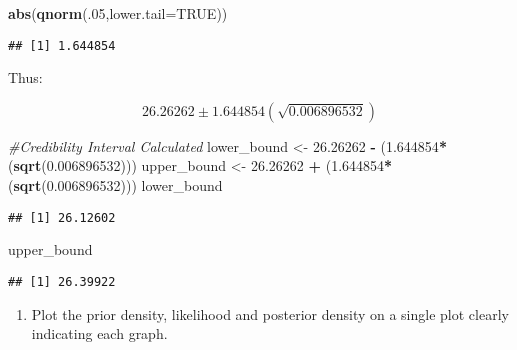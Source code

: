 \documentclass[]{article}
\newenvironment{Shaded}{\begin{snugshade}}{\end{snugshade}}
\newcommand{\KeywordTok}[1]{\textcolor[rgb]{0.13,0.29,0.53}{\textbf{#1}}}
\newcommand{\DataTypeTok}[1]{\textcolor[rgb]{0.13,0.29,0.53}{#1}}
\newcommand{\DecValTok}[1]{\textcolor[rgb]{0.00,0.00,0.81}{#1}}
\newcommand{\FloatTok}[1]{\textcolor[rgb]{0.00,0.00,0.81}{#1}}
\newcommand{\StringTok}[1]{\textcolor[rgb]{0.31,0.60,0.02}{#1}}
\newcommand{\CommentTok}[1]{\textcolor[rgb]{0.56,0.35,0.01}{\textit{#1}}}
\newcommand{\OtherTok}[1]{\textcolor[rgb]{0.56,0.35,0.01}{#1}}
\newcommand{\OperatorTok}[1]{\textcolor[rgb]{0.81,0.36,0.00}{\textbf{#1}}}
\newcommand{\NormalTok}[1]{#1}
\providecommand{\tightlist}{%
  \setlength{\itemsep}{0pt}\setlength{\parskip}{0pt}}
\begin{document}
\begin{Shaded}
\begin{Highlighting}[]
\KeywordTok{abs}\NormalTok{(}\KeywordTok{qnorm}\NormalTok{(.}\DecValTok{05}\NormalTok{,}\DataTypeTok{lower.tail=}\OtherTok{TRUE}\NormalTok{))}
\end{Highlighting}
\end{Shaded}

\begin{verbatim}
## [1] 1.644854
\end{verbatim}

Thus:

\[ 26.26262 \pm 1.644854(\sqrt{0.006896532}) \]

\begin{Shaded}
\begin{Highlighting}[]
\CommentTok{#Credibility Interval Calculated}
\NormalTok{lower_bound <-}\StringTok{ }\FloatTok{26.26262} \OperatorTok{-}\StringTok{ }\NormalTok{(}\FloatTok{1.644854}\OperatorTok{*}\NormalTok{(}\KeywordTok{sqrt}\NormalTok{(}\FloatTok{0.006896532}\NormalTok{)))}
\NormalTok{upper_bound <-}\StringTok{ }\FloatTok{26.26262} \OperatorTok{+}\StringTok{ }\NormalTok{(}\FloatTok{1.644854}\OperatorTok{*}\NormalTok{(}\KeywordTok{sqrt}\NormalTok{(}\FloatTok{0.006896532}\NormalTok{)))}
\NormalTok{lower_bound}
\end{Highlighting}
\end{Shaded}

\begin{verbatim}
## [1] 26.12602
\end{verbatim}

\begin{Shaded}
\begin{Highlighting}[]
\NormalTok{upper_bound}
\end{Highlighting}
\end{Shaded}

\begin{verbatim}
## [1] 26.39922
\end{verbatim}

\begin{enumerate}
\def\labelenumi{\alph{enumi})}
\setcounter{enumi}{2}
\tightlist
\item
  Plot the prior density, likelihood and posterior density on a single
  plot clearly indicating each graph.
\end{enumerate}
\end{document}

